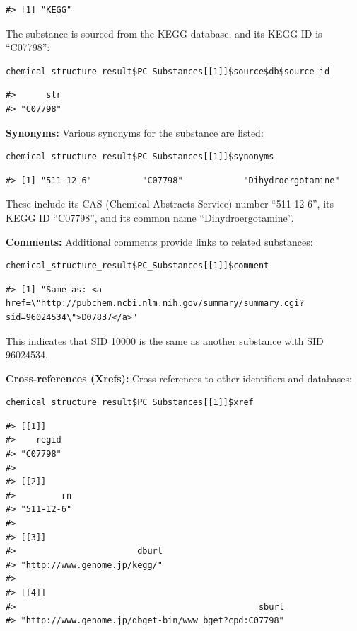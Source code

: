 \begin{verbatim}
#> [1] "KEGG"
\end{verbatim}

The substance is sourced from the KEGG database, and its KEGG ID is ``C07798'':

\begin{verbatim}
chemical_structure_result$PC_Substances[[1]]$source$db$source_id
\end{verbatim}

\begin{verbatim}
#>      str 
#> "C07798"
\end{verbatim}

\textbf{Synonyms:}
Various synonyms for the substance are listed:

\begin{verbatim}
chemical_structure_result$PC_Substances[[1]]$synonyms
\end{verbatim}

\begin{verbatim}
#> [1] "511-12-6"          "C07798"            "Dihydroergotamine"
\end{verbatim}

These include its CAS (Chemical Abstracts Service) number ``511-12-6'', its KEGG ID ``C07798'', and its common name ``Dihydroergotamine''.

\textbf{Comments:}
Additional comments provide links to related substances:

\begin{verbatim}
chemical_structure_result$PC_Substances[[1]]$comment
\end{verbatim}

\begin{verbatim}
#> [1] "Same as: <a href=\"http://pubchem.ncbi.nlm.nih.gov/summary/summary.cgi?sid=96024534\">D07837</a>"
\end{verbatim}

This indicates that SID 10000 is the same as another substance with SID 96024534.

\textbf{Cross-references (Xrefs):}
Cross-references to other identifiers and databases:

\begin{verbatim}
chemical_structure_result$PC_Substances[[1]]$xref
\end{verbatim}

\begin{verbatim}
#> [[1]]
#>    regid 
#> "C07798" 
#> 
#> [[2]]
#>         rn 
#> "511-12-6" 
#> 
#> [[3]]
#>                        dburl 
#> "http://www.genome.jp/kegg/" 
#> 
#> [[4]]
#>                                                sburl 
#> "http://www.genome.jp/dbget-bin/www_bget?cpd:C07798"
\end{verbatim}

